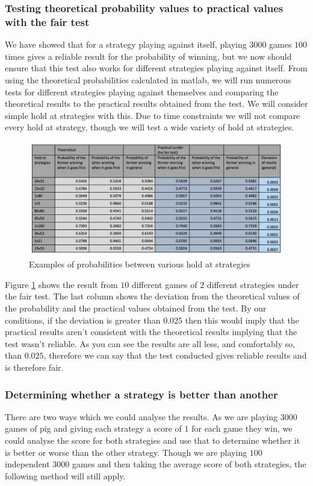 \documentclass[a4paper,titlepage]{article}
\begin{document}
\subsubsection{Testing theoretical probability values to practical values with the fair test}
We have showed that for a strategy playing against itself, playing $3000$ games $100$ times gives a reliable result for the probability of winning, but we now should ensure that this test also works for different strategies playing against itself. From using the theoretical probabilities calculated in matlab, we will run numerous tests for different strategies playing against themselves and comparing the theoretical results to the practical results obtained from the test. We will consider simple hold at strategies with this. Due to time constraints we will not compare every hold at strategy, though we will test a wide variety of hold at strategies.
\begin{figure}
\centering
\includegraphics[width=\textwidth]{stats_table}
\caption{Examples of probabilities between various hold at strategies\label{figure17}}
\end{figure}
Figure \ref{figure17} shows the result from $10$ different games of $2$ different strategies under the fair test. The last column shows the deviation from the theoretical values of the probability and the practical values obtained from the test. By our conditions, if the deviation is greater than $0.025$ then this would imply that the practical results aren’t consistent with the theoretical results implying that the test wasn’t reliable. As you can see the results are all less, and comfortably so, than $0.025$, therefore we can say that the test conducted gives reliable results and is therefore fair.
\subsubsection{Determining whether a strategy is better than another}
There are two ways which we could analyse the results. As we are playing $3000$ games of pig and giving each strategy a score of $1$ for each game they win, we could analyse the score for both strategies and use that to determine whether it is better or worse than the other strategy. Though we are playing $100$ independent $3000$ games and then taking the average score of both strategies, the following method will still apply.
\end{document}
